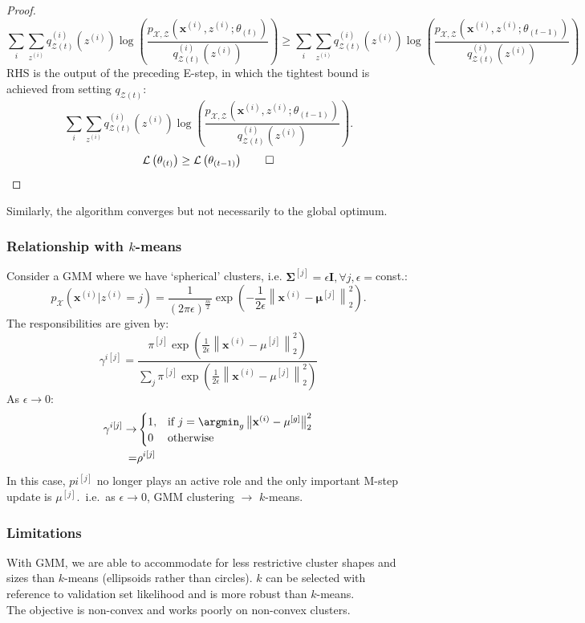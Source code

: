 \begin{itemize}
\begin{proof}
      \[\sum_{i} \sum_{z^{(i)}}  q_{\mathcal{Z}(t)}^{(i)}\left( z^{(i)} \right) \log\left( \frac{p_{\mathcal{X},\mathcal{Z}}\left( \mathbf{x}^{(i)},z^{(i)};\theta_{(t)} \right)}{q^{(i)}_{\mathcal{Z}(t)}\left( z^{(i)} \right) } \right)\ge\sum_{i} \sum_{z^{(i)}}  q_{\mathcal{Z}(t)}^{(i)}\left( z^{(i)} \right) \log\left( \frac{p_{\mathcal{X},\mathcal{Z}}\left( \mathbf{x}^{(i)},z^{(i)};\theta_{(t-1)} \right)}{q^{(i)}_{\mathcal{Z}(t)}\left( z^{(i)} \right) } \right)\] 
      RHS is the output of the preceding E-step, in which the tightest bound is achieved from
      setting $q_{\mathcal{Z}(t)}$:
      \[\sum_{i} \sum_{z^{(i)}}  q_{\mathcal{Z}(t)}^{(i)}\left( z^{(i)} \right) \log\left( \frac{p_{\mathcal{X},\mathcal{Z}}\left( \mathbf{x}^{(i)},z^{(i)};\theta_{(t-1)} \right)}{q^{(i)}_{\mathcal{Z}(t)}\left( z^{(i)} \right) } \right).\] 
    \[\mathcal{L}\left( \theta_{(t)}\right)\ge \mathcal{L}\left( \theta_{(t-1)} \right)\qed\]
    \end{proof}
    Similarly, the algorithm converges but not necessarily to the global optimum.
\end{itemize}
\subsubsection{Relationship with $k$-means}
Consider a GMM where we have `spherical' clusters, i.e.
$\mathbf{\Sigma}^{[j]}=\epsilon\mathbf{I},\forall j,\epsilon=$const.:
\[p_\mathcal{X}\left( \mathbf{x}^{(i)}|z^{(i)}=j \right) =\frac{1}{{\left( 2\pi\epsilon \right)}^{\frac{m}{2}} }\exp\left( -\frac{1}{2\epsilon}\left\lVert \mathbf{x}^{(i)}-\mathbf{\mu}^{[j]} \right\rVert_2^2 \right).\]
The responsibilities are given by:
\[\gamma^{i[j]}=\frac{\pi^{[j]}\exp\left( \frac{1}{2\epsilon}\left\lVert \mathbf{x}^{(i)}-\mu^{[j]}\right\rVert_2^2\right)}{\sum_{j} \pi^{[j]}\exp\left( \frac{1}{2\epsilon}\left\lVert \mathbf{x}^{(i)}-\mu^{[j]} \right\rVert_2^2\right)}\]
As $\epsilon\to 0$:
\begin{align*}
  \gamma^{i[j]}\to&\begin{cases}1,&\text{if }j=\argmin_g\left\lVert
  \mathbf{x}^{(i)}-\mathbf{\mu}^{[g]}
\right\rVert_2^2\\0&\text{otherwise}\end{cases}\\
      =&\rho^{i[j]}
\end{align*}
In this case, $pi^{[j]}$ no longer plays an active role and the only important
M-step update is $\mu^{[j]}$.\ i.e.\ as $\epsilon\to 0$, GMM clustering $\to$
$k$-means.
\subsubsection{Limitations}
With GMM, we are able to accommodate for less restrictive cluster shapes and
sizes than $k$-means (ellipsoids rather than circles). $k$ can be selected with
reference to validation set likelihood and is more robust than $k$-means.\\
The objective is non-convex and works poorly on non-convex clusters.

